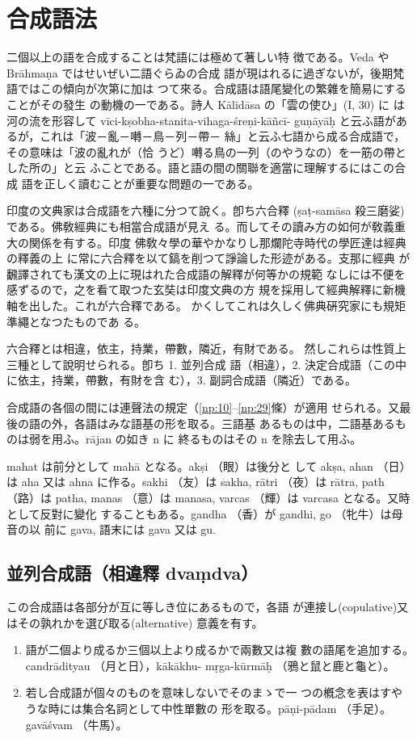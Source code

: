 \section{合成語法}
\numberParagraph
二個以上の語を合成することは梵語には極めて著しい特
徴である。Veda や Brāhmaṇa ではせいぜい二語ぐらゐの合成
語が現はれるに過ぎないが，後期梵語ではこの傾向が次第に加は
つて來る。合成語は語尾變化の繁雜を簡易にすることがその發生
の動機の一である。詩人 Kālidāsa の「雲の使ひ」(I, 30) に
は河の流を形容して vīci-kṣobha-stanita-vihaga-śreṇi-kāñcī-
guṇāyāḥ と云ふ語があるが，これは「波－亂－囀－鳥－列－帶－
絲」と云ふ七語から成る合成語で，その意味は「波の亂れが（恰
うど）囀る鳥の一列（のやうなの）を一筋の帶とした所の」と云
ふことである。語と語の間の關聯を適當に理解するにはこの合成
語を正しく讀むことが重要な問題の一である。

\numberParagraph
印度の文典家は合成語を六種に分つて說く。卽ち六合釋
(ṣaṭ-samāsa 殺三磨娑)である。佛敎經典にも相當合成語が見え
る。而してその讀み方の如何が敎義重大の関係を有する。印度
佛敎々學の華やかなりし那爛陀寺時代の學匠達は經典の釋義の上
に常に六合釋を以て鎬を削つて諍論した形迹がある。支那に經典
が飜譯されても漢文の上に現はれた合成語の解釋が何等かの規範
なしには不便を感ずるので，之を看て取つた玄奘は印度文典の方
規を採用して經典解釋に新機軸を出した。これが六合釋である。
かくしてこれは久しく佛典硏究家にも規矩準繩となつたものであ
る。

\numberParagraph
六合釋とは相違，依主，持業，帶數，隣近，有財である。
然しこれらは性質上三種として說明せられる。卽ち 1. 並列合成
語（相違），2. 決定合成語（この中に依主，持業，帶數，有財を含
む），3. 副詞合成語（隣近）である。

\numberParagraph
合成語の各個の間には連聲法の規定（\ref{np:10}--\ref{np:29}條）が適用
せられる。又最後の語の外，各語はみな語基の形を取る。三語基
あるものは中，二語基あるものは弱を用ふ。rājan の如き n に
終るものはその n を除去して用ふ。

\numberParagraph
mahat は前分として mahā となる。akṣi （眼）は後分と
して akṣa, ahan （日）は aha 又は ahna に作る。sakhi （友）は
sakha, rātri （夜）は rātra, path （路）は patha, manas （意）は
manasa, varcas （輝）は varcasa となる。又時として反對に變化
することもある。gandha （香）が gandhi, go （牝牛）は母音の以
前に gava, 語末には gava 又は gu.

\subsection{並列合成語（相違釋 dvaṃdva）}
\numberParagraph
この合成語は各部分が互に等しき位にあるもので，各語
が連接し(copulative)又はその孰れかを選び取る(alternative)
意義を有す。
\begin{enumerate}[label=(\alph*)]
\item 語が二個より成るか三個以上より成るかで兩數又は複
數の語尾を追加する。candrādityau （月と日），kākākhu-%
mṛga-kūrmāḥ （鴉と鼠と鹿と龜と）。
\item 若し合成語が個々のものを意味しないでそのまゝで一
つの槪念を表はすやうな時には集合名詞として中性單數の
形を取る。pāṇi-pādam （手足）。gavāśvam （牛馬）。
\end{enumerate}

